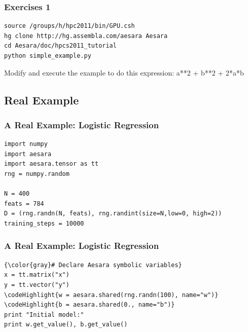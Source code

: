 \documentclass[a4paper,9pt]{beamer}
\begin{document}
\begin{frame}[fragile]
  \frametitle{Exercises 1}
  \begin{Verbatim}
source /groups/h/hpc2011/bin/GPU.csh
hg clone http://hg.assembla.com/aesara Aesara
cd Aesara/doc/hpcs2011_tutorial
python simple_example.py
  \end{Verbatim}
  \vfill
Modify and execute the example to do this expression: a**2 + b**2 + 2*a*b
\end{frame}

\subsection{Real Example}

\begin{frame}[fragile]
  \frametitle{A Real Example: Logistic Regression}
\begin{Verbatim}[commandchars=\\\{\}]
import numpy
import aesara
import aesara.tensor as tt
rng = numpy.random

N = 400
feats = 784
D = (rng.randn(N, feats), rng.randint(size=N,low=0, high=2))
training_steps = 10000
\end{Verbatim}
\end{frame}

\begin{frame}[fragile]
  \frametitle{A Real Example: Logistic Regression}
\begin{Verbatim}[commandchars=\\\{\}]
{\color{gray}# Declare Aesara symbolic variables}
x = tt.matrix("x")
y = tt.vector("y")
\codeHighlight{w = aesara.shared(rng.randn(100), name="w")}
\codeHighlight{b = aesara.shared(0., name="b")}
print "Initial model:"
print w.get_value(), b.get_value()
\end{Verbatim}
\end{frame}
\end{document}
